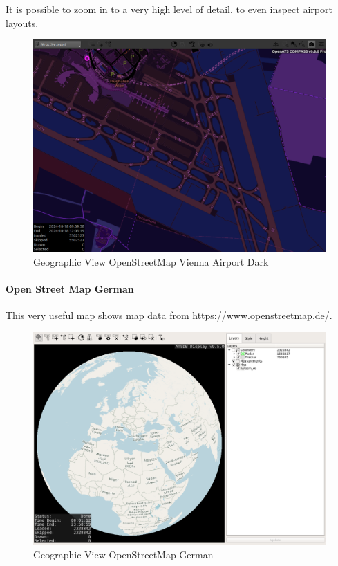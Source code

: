 It is possible to zoom in to a very high level of detail, to even inspect airport layouts.

\begin{figure}[H]
    \hspace*{-2.5cm}
    \includegraphics[width=19cm,frame]{figures/geoview_osm_vienna_dark.png}
  \caption{Geographic View OpenStreetMap Vienna Airport Dark}
\end{figure}

\newpage
\paragraph{Open Street Map German}

This very useful map shows map data from \url{https://www.openstreetmap.de/}.

\begin{figure}[H]
    \hspace*{-2.5cm}
    \includegraphics[width=19cm,frame]{figures/geoview_osm_de.png}
  \caption{Geographic View OpenStreetMap German}
\end{figure}

